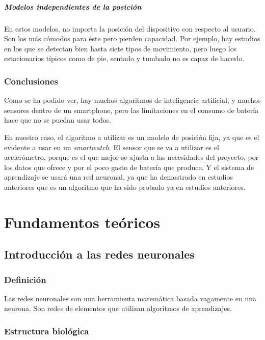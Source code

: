 \documentclass[12pt]{book}
\numberwithin{equation}{section}
\begin{document}
\paragraph{Modelos independientes de la posición}

En estos modelos, no importa la posición del dispositivo con respecto al usuario. Son los más cómodos para éste pero pierden capacidad. Por ejemplo, hay estudios en los que se detectan bien hasta siete tipos de movimiento, pero luego los estacionarios típicos como de pie, sentado y tumbado no es capaz de hacerlo\cite{6488584}.%

\subsection{Conclusiones}

Como se ha podido ver, hay muchos algoritmos de inteligencia artificial, y muchos sensores dentro de un smartphone, pero las limitaciones en el consumo de batería hace que no se puedan usar todos.

En nuestro caso, el algoritmo a utilizar es un modelo de posición fija, ya que es el evidente a usar en un \textit{smartwatch}. El sensor que se va a utilizar es el acelerómetro, porque es el que mejor se ajusta a las necesidades del proyecto, por los datos que ofrece y por el poco gasto de batería que produce. Y el sistema de aprendizaje se usará una red neuronal, ya que ha demostrado en estudios anteriores que es un algoritmo que ha sido probado ya en estudios anteriores.


\chapter{Fundamentos teóricos}
\section{Introducción a las redes neuronales}
\subsection{Definición}
Las redes neuronales son una herramienta matemática basada vagamente en una neurona. Son redes de elementos que utilizan algoritmos de aprendizajes.

\subsection{Estructura biológica}
\end{document}
